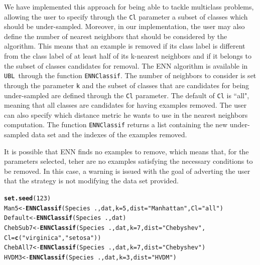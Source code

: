 \documentclass[10pt,a4paper]{article}\usepackage[]{graphicx}\usepackage[]{color}
\makeatletter
\newcommand{\hlnum}[1]{\textcolor[rgb]{0.686,0.059,0.569}{#1}}%
\newcommand{\hlstr}[1]{\textcolor[rgb]{0.192,0.494,0.8}{#1}}%
\newcommand{\hlopt}[1]{\textcolor[rgb]{0,0,0}{#1}}%
\newcommand{\hlstd}[1]{\textcolor[rgb]{0.345,0.345,0.345}{#1}}%
\newcommand{\hlkwb}[1]{\textcolor[rgb]{0.69,0.353,0.396}{#1}}%
\newcommand{\hlkwc}[1]{\textcolor[rgb]{0.333,0.667,0.333}{#1}}%
\newcommand{\hlkwd}[1]{\textcolor[rgb]{0.737,0.353,0.396}{\textbf{#1}}}%
\newenvironment{kframe}{%
 \def\at@end@of@kframe{}%
 \ifinner\ifhmode%
  \def\at@end@of@kframe{\end{minipage}}%
  \begin{minipage}{\columnwidth}%
 \fi\fi%
 \def\FrameCommand##1{\hskip\@totalleftmargin \hskip-\fboxsep
 \colorbox{shadecolor}{##1}\hskip-\fboxsep
     \hskip-\linewidth \hskip-\@totalleftmargin \hskip\columnwidth}%
 \MakeFramed {\advance\hsize-\width
   \@totalleftmargin\z@ \linewidth\hsize
   \@setminipage}}%
 {\par\unskip\endMakeFramed%
 \at@end@of@kframe}
\newenvironment{knitrout}{}{} %
\newcommand{\UBL}{\texttt{UBL}\ }
\makeatother
\begin{document}
We have implemented this approach for being able to tackle multiclass problems, allowing the user to specify through the \texttt{Cl} parameter a subset of classes which should be under-sampled. Moreover, in our implementation, the user may also define the number of nearest neighbors that should be considered by the algorithm. This means that an example is removed if its class label is different from the class label of at least half of its k-nearest neighbors and if it belongs to the subset of classes candidates for removal. The ENN algorithm is available in \UBL through the function \texttt{ENNClassif}. The number of neighbors to consider is set through the parameter \texttt{k} and the subset of classes that are candidates for being under-sampled are defined through the \texttt{Cl} parameter. The default of \texttt{Cl} is ``all", meaning that all classes are candidates for having examples removed. The user can also specify which distance metric he wants to use in the nearest neighbors computation. The function \texttt{ENNClassif} returns a list containing the new under-sampled data set and the indexes of the examples removed.

It is possible that ENN finds no examples to remove, which means that, for the parameters selected, teher are no examples satisfying the necessary conditions to be removed. In this case, a warning is issued with the goal of adverting the user that the strategy is not modifying the data set provided.


\begin{knitrout}\footnotesize
{}\color{fgcolor}\begin{kframe}
\begin{alltt}
  \hlkwd{set.seed}\hlstd{(}\hlnum{123}\hlstd{)}
  \hlstd{Man5} \hlkwb{<-} \hlkwd{ENNClassif}\hlstd{(Species}\hlopt{~}\hlstd{., dat,} \hlkwc{k}\hlstd{=}\hlnum{5}\hlstd{,} \hlkwc{dist}\hlstd{=}\hlstr{"Manhattan"}\hlstd{,} \hlkwc{Cl}\hlstd{=}\hlstr{"all"}\hlstd{)}
  \hlstd{Default} \hlkwb{<-} \hlkwd{ENNClassif}\hlstd{(Species}\hlopt{~}\hlstd{., dat)}
  \hlstd{ChebSub7} \hlkwb{<-} \hlkwd{ENNClassif}\hlstd{(Species}\hlopt{~}\hlstd{., dat,} \hlkwc{k}\hlstd{=}\hlnum{7}\hlstd{,} \hlkwc{dist}\hlstd{=}\hlstr{"Chebyshev"}\hlstd{,}
                         \hlkwc{Cl}\hlstd{=}\hlkwd{c}\hlstd{(}\hlstr{"virginica"}\hlstd{,} \hlstr{"setosa"}\hlstd{))}
  \hlstd{ChebAll7} \hlkwb{<-} \hlkwd{ENNClassif}\hlstd{(Species}\hlopt{~}\hlstd{., dat,} \hlkwc{k}\hlstd{=}\hlnum{7}\hlstd{,} \hlkwc{dist}\hlstd{=}\hlstr{"Chebyshev"}\hlstd{)}
  \hlstd{HVDM3} \hlkwb{<-} \hlkwd{ENNClassif}\hlstd{(Species}\hlopt{~}\hlstd{., dat,} \hlkwc{k}\hlstd{=}\hlnum{3}\hlstd{,} \hlkwc{dist}\hlstd{=}\hlstr{"HVDM"}\hlstd{)}
\end{alltt}
\end{kframe}
\end{knitrout}
\end{document}
